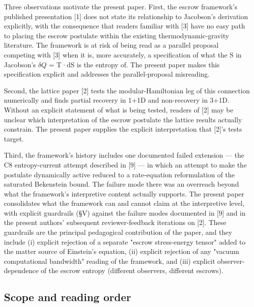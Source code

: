\documentclass[11pt]{article}
\begin{document}
Three observations motivate the present paper. First, the escrow
framework's published presentation [1] does not state its
relationship to Jacobson's derivation explicitly, with the consequence
that readers familiar with [3] have no easy path to placing the escrow
postulate within the existing thermodynamic-gravity literature. The
framework is at risk of being read as a parallel proposal competing with
[3] when it is, more accurately, a specification of what the S in
Jacobson's $\delta Q$ = T·dS is the entropy of. The present paper makes this
specification explicit and addresses the parallel-proposal misreading.

Second, the lattice paper [2] tests the modular-Hamiltonian leg of
this connection numerically and finds partial recovery in 1+1D and
non-recovery in 3+1D. Without an explicit statement of what is being
tested, readers of [2] may be unclear which interpretation of the
escrow postulate the lattice results actually constrain. The present
paper supplies the explicit interpretation that [2]'s tests target.

Third, the framework's history includes one documented failed extension
--- the C8 entropy-current attempt described in [9] --- in which an
attempt to make the postulate dynamically active reduced to a
rate-equation reformulation of the saturated Bekenstein bound. The
failure mode there was an overreach beyond what the framework's
interpretive content actually supports. The present paper consolidates
what the framework can and cannot claim at the interpretive level, with
explicit guardrails (§V) against the failure modes documented in [9]
and in the present authors' subsequent reviewer-feedback iterations on
[2]. These guardrails are the principal pedagogical contribution of
the paper, and they include (i) explicit rejection of a separate
"escrow stress-energy tensor" added to the matter source of
Einstein's equation, (ii) explicit rejection of any "vacuum
computational bandwidth" reading of the framework, and (iii) explicit
observer-dependence of the escrow entropy (different observers,
different escrows).


\subsection{Scope and reading order}
\end{document}
